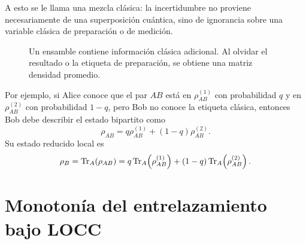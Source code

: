 \documentclass[../main.tex]{subfiles}
\begin{document}
A esto se le llama una mezcla clásica: la incertidumbre no proviene necesariamente de una superposición cuántica, sino de ignorancia sobre una variable clásica de preparación o de medición.

\begin{figure}[H]
\centering
\shorthandoff{<>}
\shorthandon{<>}
\caption{Un ensamble contiene información clásica adicional. Al olvidar el resultado o la etiqueta de preparación, se obtiene una matriz densidad promedio.}
\label{fig:ensamble-mezcla}
\end{figure}

Por ejemplo, si Alice conoce que el par \(AB\) está en \(\rho_{AB}^{(1)}\) con probabilidad \(q\) y en \(\rho_{AB}^{(2)}\) con probabilidad \(1-q\), pero Bob no conoce la etiqueta clásica, entonces Bob debe describir el estado bipartito como
\begin{equation*}
    \rho_{AB}=q\rho_{AB}^{(1)}+(1-q)\rho_{AB}^{(2)}.
\end{equation*}
Su estado reducido local es
\begin{equation*}
    \rho_B
    =\Tr_A(\rho_{AB})
    =q\Tr_A\!\left(\rho_{AB}^{(1)}\right)
    +(1-q)\Tr_A\!\left(\rho_{AB}^{(2)}\right).
\end{equation*}

\section{Monotonía del entrelazamiento bajo LOCC}
\end{document}
